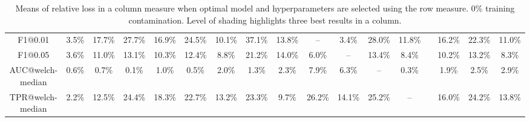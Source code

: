 \begin{table*}
{\begin{tabular}[h]{c c c c c c c c c c c c c c c c c }
  F1@0.01 & 3.5\% & 17.7\% & 27.7\% & 16.9\% & 24.5\% & 10.1\% & 37.1\% & 13.8\% & -- & \cellcolor{gray!45}3.4\% & 28.0\% & 11.8\% &  & 16.2\% & 22.3\% & 11.0\%  \\ 
  F1@0.05 & 3.6\% & 11.0\% & 13.1\% & 10.3\% & 12.4\% & 8.8\% & 21.2\% & 14.0\% & \cellcolor{gray!45}6.0\% & -- & 13.4\% & 8.4\% &  & 10.2\% & 13.2\% & 8.3\%  \\ 
  AUC@welch-median & 0.6\% & 0.7\% & \cellcolor{gray!45}0.1\% & \cellcolor{gray!30}1.0\% & \cellcolor{gray!30}0.5\% & 2.0\% & \cellcolor{gray!45}1.3\% & 2.3\% & \cellcolor{gray!15}7.9\% & 6.3\% & -- & \cellcolor{gray!30}0.3\% &  & \cellcolor{gray!30}1.9\% & \cellcolor{gray!30}2.5\% & 2.9\%  \\ 
  TPR@welch-median & 2.2\% & 12.5\% & 24.4\% & 18.3\% & 22.7\% & 13.2\% & 23.3\% & 9.7\% & 26.2\% & 14.1\% & 25.2\% & -- &  & 16.0\% & 24.2\% & 13.8\%  \\ 
 \end{tabular}
 }
 \caption{Means of relative loss in a column measure when optimal model and hyperparameters are selected using the row measure. 0\%  training contamination. Level of shading highlights three best results in a column.} 
 \label{tab:measure_comparison_full_0_by_models_welch_median} 
\end{table*}